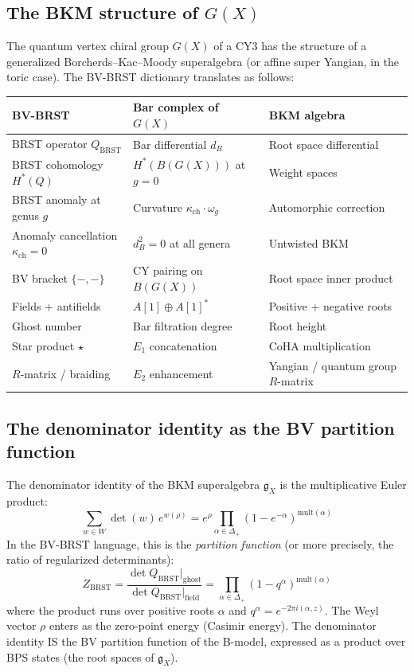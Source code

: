 \documentclass[11pt]{amsart}
\theoremstyle{plain}
\theoremstyle{definition}
\theoremstyle{remark}
\newcommand{\BRST}{\mathrm{BRST}}
\begin{document}
\subsection{The BKM structure of $G(X)$}
\label{subsec:bkm-gx}

The quantum vertex chiral group $G(X)$ of a CY3 has the structure of a generalized Borcherds--Kac--Moody superalgebra (or affine super Yangian, in the toric case). The BV-BRST dictionary translates as follows:

\begin{center}
\renewcommand{\arraystretch}{1.4}
\begin{tabular}{lll}
 \textbf{BV-BRST} & \textbf{Bar complex of $G(X)$} & \textbf{BKM algebra} \\
 \hline
 BRST operator $Q_{\BRST}$ & Bar differential $d_B$ & Root space differential \\
 BRST cohomology $H^*(Q)$ & $H^*(B(G(X)))$ at $g=0$ & Weight spaces \\
 BRST anomaly at genus $g$ & Curvature $\kappa_{\mathrm{ch}} \cdot \omega_g$ & Automorphic correction \\
 Anomaly cancellation $\kappa_{\mathrm{ch}} = 0$ & $d_B^2 = 0$ at all genera & Untwisted BKM \\
 BV bracket $\{-,-\}$ & CY pairing on $B(G(X))$ & Root space inner product \\
 Fields + antifields & $A[1] \oplus A[1]^*$ & Positive + negative roots \\
 Ghost number & Bar filtration degree & Root height \\
 Star product $\star$ & $E_1$ concatenation & CoHA multiplication \\
 $R$-matrix / braiding & $E_2$ enhancement & Yangian / quantum group $R$-matrix
\end{tabular}
\end{center}

\subsection{The denominator identity as the BV partition function}
\label{subsec:denominator-bv}

The denominator identity of the BKM superalgebra $\mathfrak{g}_X$ is the multiplicative Euler product:
\[
 \sum_{w \in W} \det(w)\, e^{w(\rho)} = e^{\rho} \prod_{\alpha \in \Delta_+} (1 - e^{-\alpha})^{\mathrm{mult}(\alpha)}
\]
In the BV-BRST language, this is the \emph{partition function} (or more precisely, the ratio of regularized determinants):
\[
 Z_{\BRST} = \frac{\det Q_{\BRST}|_{\mathrm{ghost}}}{\det Q_{\BRST}|_{\mathrm{field}}} = \prod_{\alpha \in \Delta_+} (1 - q^\alpha)^{\mathrm{mult}(\alpha)}
\]
where the product runs over positive roots $\alpha$ and $q^\alpha = e^{-2\pi i (\alpha, z)}$. The Weyl vector $\rho$ enters as the zero-point energy (Casimir energy). The denominator identity IS the BV partition function of the B-model, expressed as a product over BPS states (the root spaces of $\mathfrak{g}_X$).
\end{document}
